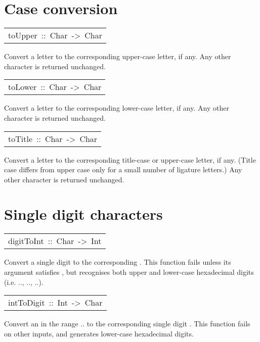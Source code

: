 \section{Case conversion
}
\begin{haddockdesc}
\item[\begin{tabular}{@{}l}
toUpper\ ::\ Char\ ->\ Char
\end{tabular}]\haddockbegindoc
Convert a letter to the corresponding upper-case letter, if any.
 Any other character is returned unchanged.
\par

\end{haddockdesc}
\begin{haddockdesc}
\item[\begin{tabular}{@{}l}
toLower\ ::\ Char\ ->\ Char
\end{tabular}]\haddockbegindoc
Convert a letter to the corresponding lower-case letter, if any.
 Any other character is returned unchanged.
\par

\end{haddockdesc}
\begin{haddockdesc}
\item[\begin{tabular}{@{}l}
toTitle\ ::\ Char\ ->\ Char
\end{tabular}]\haddockbegindoc
Convert a letter to the corresponding title-case or upper-case
 letter, if any.  (Title case differs from upper case only for a small
 number of ligature letters.)
 Any other character is returned unchanged.
\par

\end{haddockdesc}
\section{Single digit characters
}
\begin{haddockdesc}
\item[\begin{tabular}{@{}l}
digitToInt\ ::\ Char\ ->\ Int
\end{tabular}]\haddockbegindoc
Convert a single digit  to the corresponding .  
 This function fails unless its argument satisfies ,
 but recognises both upper and lower-case hexadecimal digits
 (i.e. .., .., ..).
\par

\end{haddockdesc}
\begin{haddockdesc}
\item[\begin{tabular}{@{}l}
intToDigit\ ::\ Int\ ->\ Char
\end{tabular}]\haddockbegindoc
Convert an  in the range .. to the corresponding single
 digit .  This function fails on other inputs, and generates
 lower-case hexadecimal digits.
\par

\end{haddockdesc}
